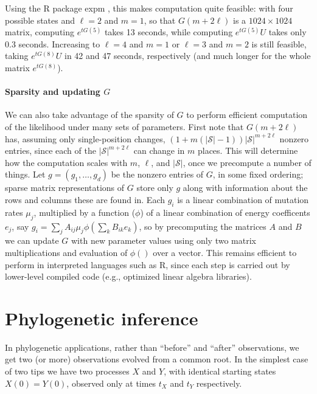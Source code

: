 \documentclass{article}
\newcommand{\calS}{\mathcal{S}}  %
\theoremstyle{plain}
\theoremstyle{definition}
\begin{document}
Using the R package expm \citep{R_expm}, this makes computation quite feasible:
with four possible states and $\ell=2$ and $m=1$, so that $G(m+2\ell)$ is a $1024 \times 1024$ matrix,
computing $e^{t G(5) }$ takes 13 seconds, while computing $e^{t G(5)} U$ takes only 0.3 seconds.
Increasing to $\ell=4$ and $m=1$ or $\ell=3$ and $m=2$ is still feasible, taking $e^{t G(8)} U$ in 42 and 47 seconds, respectively
(and much longer for the whole matrix $e^{t G(8)}$).

\paragraph{Sparsity and updating $G$}
We can also take advantage of the sparsity of $G$ to perform efficient computation of the likelihood
under many sets of parameters.
First note that $G(m+2\ell)$ has, assuming only single-position changes,
$(1+m(|\calS|-1)) |\calS|^{m+2\ell}$ nonzero entries, since each of the $|\calS|^{m+2\ell}$ can change in $m$ places.
This will determine how the computation scales with $m$, $\ell$, and $|\calS|$,
once we precompute a number of things.
Let $g = (g_1, \ldots, g_d)$ be the nonzero entries of $G$, in some fixed ordering;
sparse matrix representations of $G$ store only $g$ along with information about the rows and columns these are found in.
Each $g_i$ is a linear combination of mutation rates $\mu_j$,
multiplied by a function ($\phi$) of a linear combination of energy coefficents $e_j$,
say $g_i = \sum_j A_{ij} \mu_j \phi(\sum_k B_{ik} e_k)$,
so by precomputing the matrices $A$ and $B$ we can update $G$ with new parameter values
using only two matrix multiplications and evaluation of $\phi()$ over a vector.
This remains efficient to perform in interpreted languages such as R,
since each step is carried out by lower-level compiled code (e.g., optimized linear algebra libraries).

\section{Phylogenetic inference}

In phylogenetic applications, rather than ``before'' and ``after'' observations,
we get two (or more) observations evolved from a common root.
In the simplest case of two tips we have two processes $X$ and $Y$,
with identical starting states $X(0)=Y(0)$,
observed only at times $t_X$ and $t_Y$ respectively.
\end{document}
